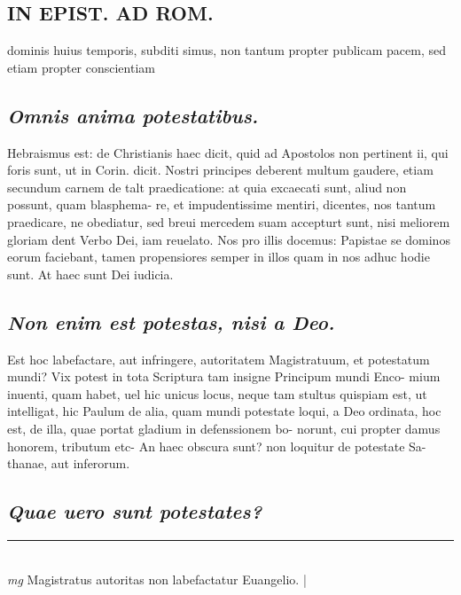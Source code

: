 \documentclass{article}
\begin{document}
\begin{pages}
\section*{IN EPIST. AD ROM.  }
\marginpar{[ p.149 ]}\pstart dominis huius temporis, subditi simus, non tantum propter publicam pacem, sed etiam propter conscientiam  \pend
{}
{}
\subsection*{\textit{Omnis anima potestatibus. }}\pstart Hebraismus est: de Christianis haec dicit, quid ad Apostolos non pertinent ii, qui foris sunt, ut in Corin. dicit. Nostri principes deberent multum gaudere, etiam secundum carnem de talt praedicatione: at quia excaecati sunt, aliud non possunt, quam blasphema- re, et impudentissime mentiri, dicentes, nos tantum praedicare, ne obediatur, sed breui mercedem suam accepturt sunt, nisi meliorem gloriam dent Verbo Dei, iam reuelato. Nos pro illis docemus: Papistae se dominos eorum faciebant, tamen propensiores semper in illos quam in nos adhuc hodie sunt. At haec sunt Dei iudicia.  \pend
{}
{}
\subsection*{\textit{Non enim est potestas, nisi a Deo. }}\pstart Est hoc labefactare, aut infringere, autoritatem Magistratuum, et potestatum mundi? Vix potest in tota Scriptura tam insigne Principum mundi Enco- mium inuenti, quam habet, uel hic unicus locus, neque tam stultus quispiam est, ut intelligat, hic Paulum de alia, quam mundi potestate loqui, a Deo ordinata, hoc est, de illa, quae portat gladium in defenssionem bo- norunt, cui propter damus honorem, tributum etc- An haec obscura sunt? non loquitur de potestate Sa- thanae, aut inferorum.   \pend
{}
{}
\subsection*{\textit{Quae uero sunt potestates? }}
\vspace{0.5cm}\noindent
\vspace{0.2cm}\rule{1cm}{0.2pt}\\ 
\hspace{0.2cm}\textit{mg}
\footnotesize Magistratus autoritas non labefactatur Euangelio.  
\normalsize| 

\end{pages}
\end{document}

